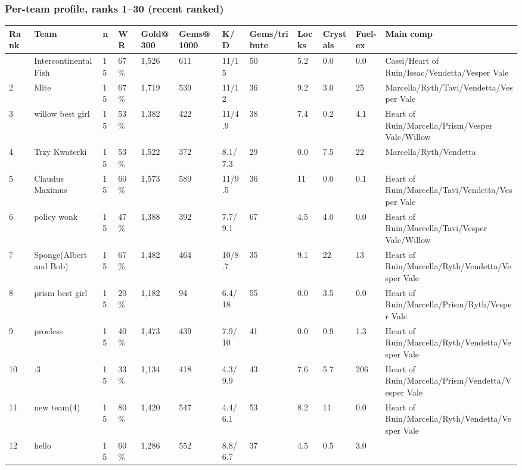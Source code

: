 \documentclass[
  10pt,
]{article}
\newcounter{none} %
\begin{document}
\subsubsection{Per-team profile, ranks 1--30 (recent
ranked)}\label{per-team-profile-ranks-130-recent-ranked}

{\def\LTcaptype{none} %
\begin{landscape}
\begin{longtable}[]{@{}llllllllllll@{}}
\toprule\noalign{}
Rank & Team & n & WR & Gold@300 & Gems@1000 & K/D & Gems/tribute & Locks
& Crystals & Fuel-ex & Main comp \\
\midrule\noalign{}
\endhead
\bottomrule\noalign{}
\endlastfoot
1 & Intercontinental Fish & 15 & 67\% & 1,526 & 611 & 11/15 & 50 & 5.2 &
0.0 & 0.0 & Cassi/Heart of Ruin/Issac/Vendetta/Vesper Vale \\
2 & Mite & 15 & 67\% & 1,719 & 539 & 11/12 & 36 & 9.2 & 3.0 & 25 &
Marcella/Ryth/Tavi/Vendetta/Vesper Vale \\
3 & willow best girl & 15 & 53\% & 1,382 & 422 & 11/4.9 & 38 & 7.4 & 0.2
& 4.1 & Heart of Ruin/Marcella/Prism/Vesper Vale/Willow \\
4 & Trzy Kwaterki & 15 & 53\% & 1,522 & 372 & 8.1/7.3 & 29 & 0.0 & 7.5 &
22 & Marcella/Ryth/Vendetta \\
5 & Claudus Maximus & 15 & 60\% & 1,573 & 589 & 11/9.5 & 36 & 11 & 0.0 &
0.1 & Heart of Ruin/Marcella/Tavi/Vendetta/Vesper Vale \\
6 & policy wonk & 15 & 47\% & 1,388 & 392 & 7.7/9.1 & 67 & 4.5 & 4.0 &
0.0 & Heart of Ruin/Marcella/Tavi/Vesper Vale/Willow \\
7 & Sponge(Albert and Bob) & 15 & 67\% & 1,482 & 464 & 10/8.7 & 35 & 9.1
& 22 & 13 & Heart of Ruin/Marcella/Ryth/Vendetta/Vesper Vale \\
8 & prism best girl & 15 & 20\% & 1,182 & 94 & 6.4/18 & 55 & 0.0 & 3.5 &
0.0 & Heart of Ruin/Marcella/Prism/Ryth/Vesper Vale \\
9 & procless & 15 & 40\% & 1,473 & 439 & 7.9/10 & 41 & 0.0 & 0.9 & 1.3 &
Heart of Ruin/Marcella/Ryth/Vendetta/Vesper Vale \\
10 & :3 & 15 & 33\% & 1,134 & 418 & 4.3/9.9 & 43 & 7.6 & 5.7 & 206 &
Heart of Ruin/Marcella/Prism/Vendetta/Vesper Vale \\
11 & new team(4) & 15 & 80\% & 1,420 & 547 & 4.4/6.1 & 53 & 8.2 & 11 &
0.0 & Heart of Ruin/Marcella/Ryth/Vendetta/Vesper Vale \\
12 & hello & 15 & 60\% & 1,286 & 552 & 8.8/6.7 & 37 & 4.5 & 0.5 & 3.0 &

\end{longtable}
\end{landscape}}
\end{document}
